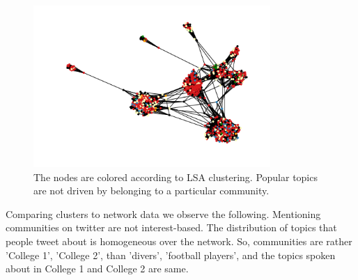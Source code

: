 \documentclass[%
 reprint,
 amsmath,amssymb,
 aps,
]{revtex4-1}
\begin{document}
\begin{figure}[htp]
\centering
\includegraphics[width=9cm]{lsa_on_graph}
\caption{The nodes are colored according to LSA clustering. Popular topics are not driven by belonging to a particular community.}
\label{fig}
\end{figure}


Comparing clusters to network data we observe the following.
Mentioning communities on twitter are not interest-based. 
The distribution of topics that people tweet about is homogeneous over the network. So, communities are rather 'College 1', 'College 2', than 'divers', 'football players', and the topics spoken about in College 1 and College 2 are same.












\end{document}
